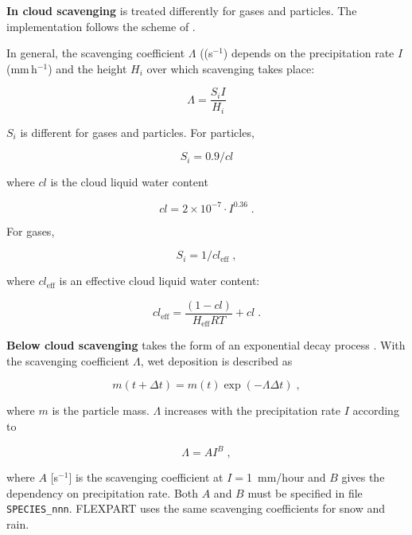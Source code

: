 \documentclass{egu}            %
\begin{document}
{\bf In cloud scavenging} is treated differently for gases and particles.  
The implementation follows the scheme of \citet{hertel1995}.

In general, the scavenging coefficient $\Lambda$ ((s$^{-1}$) depends on the precipitation
rate $I$ (mm\,h$^{-1}$) and the height $H_i$ over which scavenging takes place:

\begin{equation}
\Lambda=\frac{S_i I}{H_i}
\end{equation}

$S_i$ is different for gases and particles. For particles,

\begin{equation}
S_i=0.9/cl
\end{equation}

where $cl$ is the cloud liquid water content

\begin{equation}
cl=2\times 10^{-7}\cdot I^{0.36} \;.
\end{equation}

For gases,

\begin{equation}
S_i=1/cl_\text{eff} \;,
\end{equation}

where $cl_\text{eff}$ is an effective cloud liquid water content:

\begin{equation}
cl_\text{eff}=\frac{(1-cl)}{H_\text{eff}RT}+cl \; .
\end{equation}

{\bf Below cloud scavenging} takes the form of an exponential decay process
\citep{mcmahon1979}.  With the scavenging coefficient $\Lambda$, wet
deposition is described as

\begin{equation}
m(t+\Delta t)=m(t) \exp (- \Lambda \Delta t) \;,
\end{equation}

where $m$ is the particle mass.  $\Lambda$ increases with the precipitation
rate $I$ according to

\begin{equation}
\Lambda=AI^{B} \;,
\label{wetscav}
\end{equation}

where $A$ [s$^{-1}$] is the scavenging coefficient at $I=$1~mm/hour and $B$
gives the dependency on precipitation rate.  Both $A$ and $B$ must be specified
in file \verb|SPECIES_nnn|.  FLEXPART uses the same scavenging coefficients for
snow and rain.
\end{document}
